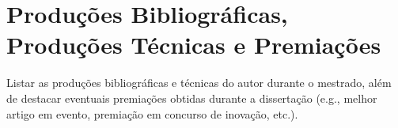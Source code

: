 \chapter*{Produções Bibliográficas, Produções Técnicas e Premiações} 


Listar as produções bibliográficas e técnicas do autor durante o mestrado, além de destacar eventuais premiações obtidas durante a dissertação (e.g., melhor artigo em evento, premiação em concurso de inovação, etc.).
